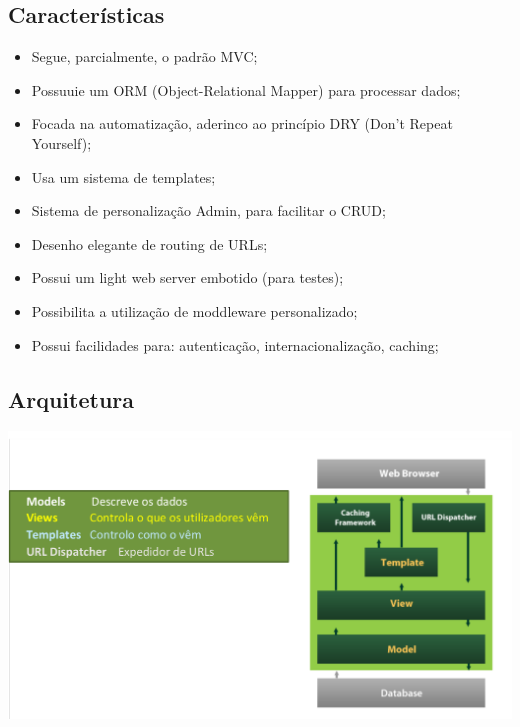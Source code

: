 \documentclass{article}
\begin{document}
\subsection{Características}

\begin{flushleft}
  \begin{itemize}
    \item Segue, parcialmente, o padrão MVC;
    \item Possuuie um ORM (Object-Relational Mapper) para processar dados;
    \item Focada na automatização, aderinco ao princípio DRY (Don't Repeat Yourself);
    \item Usa um sistema de templates;
    \item Sistema de personalização Admin, para facilitar o CRUD;
    \item Desenho elegante de routing de URLs;
    \item Possui um light web server embotido (para testes);
    \item Possibilita a utilização de moddleware personalizado;
    \item Possui facilidades para: autenticação, internacionalização, caching;
  \end{itemize}
\end{flushleft}

\pagebreak

\subsection{Arquitetura}

\begin{center}
  \includegraphics[scale=0.3]{8}
\end{center}
\end{document}
